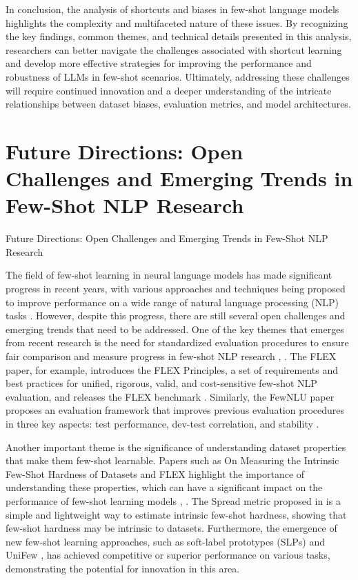 \documentclass[conference]{IEEEtran}
\begin{document}
In conclusion, the analysis of shortcuts and biases in few-shot language models highlights the complexity and multifaceted nature of these issues. By recognizing the key findings, common themes, and technical details presented in this analysis, researchers can better navigate the challenges associated with shortcut learning and develop more effective strategies for improving the performance and robustness of LLMs in few-shot scenarios. Ultimately, addressing these challenges will require continued innovation and a deeper understanding of the intricate relationships between dataset biases, evaluation metrics, and model architectures.

\section{Future Directions: Open Challenges and Emerging Trends in Few-Shot NLP Research}
Future Directions: Open Challenges and Emerging Trends in Few-Shot NLP Research

The field of few-shot learning in neural language models has made significant progress in recent years, with various approaches and techniques being proposed to improve performance on a wide range of natural language processing (NLP) tasks \cite{b1}. However, despite this progress, there are still several open challenges and emerging trends that need to be addressed. One of the key themes that emerges from recent research is the need for standardized evaluation procedures to ensure fair comparison and measure progress in few-shot NLP research \cite{b2}, \cite{b3}. The FLEX paper, for example, introduces the FLEX Principles, a set of requirements and best practices for unified, rigorous, valid, and cost-sensitive few-shot NLP evaluation, and releases the FLEX benchmark \cite{b4}. Similarly, the FewNLU paper proposes an evaluation framework that improves previous evaluation procedures in three key aspects: test performance, dev-test correlation, and stability \cite{b5}.

Another important theme is the significance of understanding dataset properties that make them few-shot learnable. Papers such as On Measuring the Intrinsic Few-Shot Hardness of Datasets and FLEX highlight the importance of understanding these properties, which can have a significant impact on the performance of few-shot learning models \cite{b6}, \cite{b4}. The Spread metric proposed in \cite{b6} is a simple and lightweight way to estimate intrinsic few-shot hardness, showing that few-shot hardness may be intrinsic to datasets. Furthermore, the emergence of new few-shot learning approaches, such as soft-label prototypes (SLPs) \cite{b7} and UniFew \cite{b8}, has achieved competitive or superior performance on various tasks, demonstrating the potential for innovation in this area.
\end{document}
